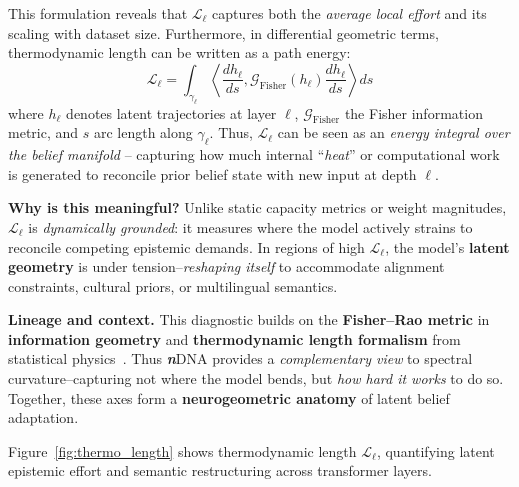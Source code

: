 \noindent
This formulation reveals that $\mathcal{L}_\ell$ captures both the \emph{average local effort} and its scaling with dataset size.  
Furthermore, in differential geometric terms, thermodynamic length can be written as a path energy:
\[
\mathcal{L}_\ell = \int_{\gamma_\ell} 
\left\langle \frac{d h_\ell}{ds}, 
\mathcal{G}_{\mathrm{Fisher}}(h_\ell)
\frac{d h_\ell}{ds} \right\rangle ds
\]
where $h_\ell$ denotes latent trajectories at layer $\ell$, $\mathcal{G}_{\mathrm{Fisher}}$ the Fisher information metric, and $s$ arc length along $\gamma_\ell$. Thus, $\mathcal{L}_\ell$ can be seen as an \emph{energy integral over the belief manifold} -- capturing how much internal ``\emph{heat}'' or computational work is generated to reconcile prior belief state with new input at depth $\ell$.


\noindent
\textbf{Why is this meaningful?}  
Unlike static capacity metrics or weight magnitudes, $\mathcal{L}_\ell$ is \emph{dynamically grounded}: it measures where the model actively strains to reconcile competing epistemic demands. In regions of high $\mathcal{L}_\ell$, the model’s \textbf{latent geometry} is under tension--\emph{reshaping itself} to accommodate alignment constraints, cultural priors, or multilingual semantics.

\vspace{0.3em}

\noindent
\textbf{Lineage and context.}  
This diagnostic builds on the \textbf{Fisher–Rao metric} in \textbf{information geometry} and \textbf{thermodynamic length formalism} from statistical physics~\citep{crooks2007measuring, oliviero2023thermodynamics, farzam2024ricci, wagner2023thermodynamic}. Thus \textbf{\textit{n}}\textnormal{DNA} provides a \emph{complementary view} to spectral curvature--capturing not where the model bends, but \emph{how hard it works} to do so. Together, these axes form a \textbf{neurogeometric anatomy} of latent belief adaptation. 

Figure~\ref{fig:thermo_length} shows thermodynamic length \(\mathcal{L}_\ell\), quantifying latent epistemic effort and semantic restructuring across transformer layers.



